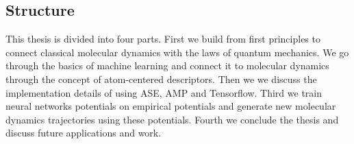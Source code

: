 \subsection{Structure}
This thesis is divided into four parts. First we build from first principles
to connect classical molecular dynamics with the laws of quantum mechanics.
We go through the basics of machine learning
and connect it to molecular dynamics through the concept of atom-centered descriptors.
Then we we discuss the implementation details of using
ASE, AMP and Tensorflow. Third we train neural networks potentials
on empirical potentials and generate new molecular dynamics trajectories
using these potentials.
Fourth we conclude the thesis and discuss future applications and work.
